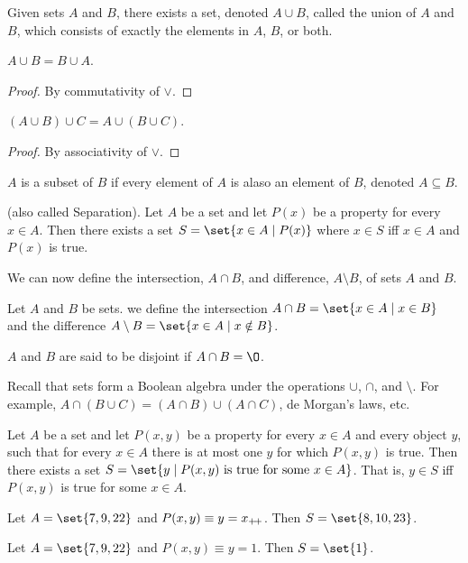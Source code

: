 \begin{axiom}[Unions] \label{def:zfc:unions}
    Given sets $A$ and $B$, there exists a set, denoted $A \cup B$, called the
    union of $A$ and $B$, which consists of exactly the elements in $A$, $B$, or
    both.
\end{axiom}

\begin{problem}
    $A \cup B = B \cup A$.
\end{problem}
\begin{proof}
    By commutativity of $\lor$.
\end{proof}
\begin{problem}
    $(A \cup B) \cup C = A \cup (B \cup C)$.
\end{problem}
\begin{proof}
    By associativity of $\lor$.
\end{proof}

\begin{definition}[Subset] \label{def:zfc:subset}
    $A$ is a subset of $B$ if every element of $A$ is alaso an element of $B$,
    denoted $A \subseteq B$.
\end{definition}

\begin{axiom}[Specification] \label{def:zfc:specification}
    (also called Separation).
    Let $A$ be a set and let $P(x)$ be a property for every $x \in A$.
    Then there exists a set $S = \set{x \in A \mid P(x)}$ where $x \in S$ iff
    $x \in A$ and $P(x)$ is true.
\end{axiom}
We can now define the intersection, $A \cap B$, and difference, $A \setminus B$,
of sets $A$ and $B$.
\begin{definition}
    Let $A$ and $B$ be sets.
    we define the intersection $A \cap B = \set{x \in A \mid x \in B}$ and the
    difference $A \setminus B = \set{x \in A \mid x \notin B}$.

    $A$ and $B$ are said to be disjoint if $A \cap B = \O$.
\end{definition}

Recall that sets form a Boolean algebra under the operations $\cup$, $\cap$, and
$\setminus$.
For example, $A \cap (B \cup C) = (A \cap B) \cup (A \cap C)$, de Morgan's laws,
etc.

\begin{axiom}[Replacement] \label{def:zfc:replacement}
    Let $A$ be a set and let $P(x, y)$ be a property for every $x \in A$ and
    every object $y$, such that for every $x \in A$ there is at most one $y$ for
    which $P(x, y)$ is true.
    Then there exists a set $S = \set{y \mid P(x, y) \text{ is true for some }
    x \in A}$.
    That is, $y \in S$ iff $P(x, y)$ is true for some $x \in A$.
\end{axiom}
\begin{examples}
    \item Let $A = \set{7, 9, 22}$ and $P(x, y) \equiv y = x_{+\!+}$.
    Then $S = \set{8, 10, 23}$.
    \item Let $A = \set{7, 9, 22}$ and $P(x, y) \equiv y = 1$.
    Then $S = \set{1}$.
\end{examples}

